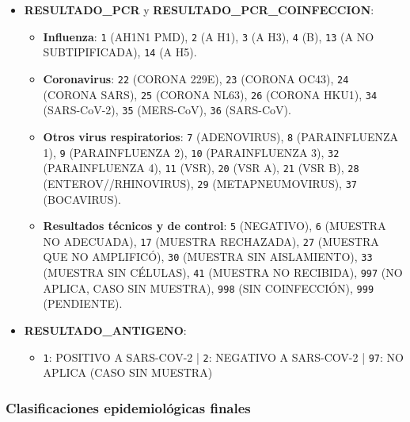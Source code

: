 \begin{itemize}
    \item \textbf{RESULTADO\_PCR} y \textbf{RESULTADO\_PCR\_COINFECCION}:
        \begin{itemize}
            \item \textbf{Influenza}: \texttt{1} (AH1N1 PMD), \texttt{2} (A H1), \texttt{3} (A H3), \texttt{4} (B), \texttt{13} (A NO SUBTIPIFICADA), \texttt{14} (A H5).
            \item \textbf{Coronavirus}: \texttt{22} (CORONA 229E), \texttt{23} (CORONA OC43), \texttt{24} (CORONA SARS), \texttt{25} (CORONA NL63), \texttt{26} (CORONA HKU1), \texttt{34} (SARS-CoV-2), \texttt{35} (MERS-CoV), \texttt{36} (SARS-CoV).
            \item \textbf{Otros virus respiratorios}: \texttt{7} (ADENOVIRUS), \texttt{8} (PARAINFLUENZA 1), \texttt{9} (PARAINFLUENZA 2), \texttt{10} (PARAINFLUENZA 3), \texttt{32} (PARAINFLUENZA 4), \texttt{11} (VSR), \texttt{20} (VSR A), \texttt{21} (VSR B), \texttt{28} (ENTEROV//RHINOVIRUS), \texttt{29} (METAPNEUMOVIRUS), \texttt{37} (BOCAVIRUS).
            \item \textbf{Resultados técnicos y de control}: \texttt{5} (NEGATIVO), \texttt{6} (MUESTRA NO ADECUADA), \texttt{17} (MUESTRA RECHAZADA), \texttt{27} (MUESTRA QUE NO AMPLIFICÓ), \texttt{30} (MUESTRA SIN AISLAMIENTO), \texttt{33} (MUESTRA SIN CÉLULAS), \texttt{41} (MUESTRA NO RECIBIDA), \texttt{997} (NO APLICA, CASO SIN MUESTRA), \texttt{998} (SIN COINFECCIÓN), \texttt{999} (PENDIENTE).
        \end{itemize}

    \item \textbf{RESULTADO\_ANTIGENO}:
        \begin{itemize}
            \item \texttt{1}: POSITIVO A SARS-COV-2 | \texttt{2}: NEGATIVO A SARS-COV-2 | \texttt{97}: NO APLICA (CASO SIN MUESTRA)
        \end{itemize}
\end{itemize}

\subsubsection{Clasificaciones epidemiológicas finales}

